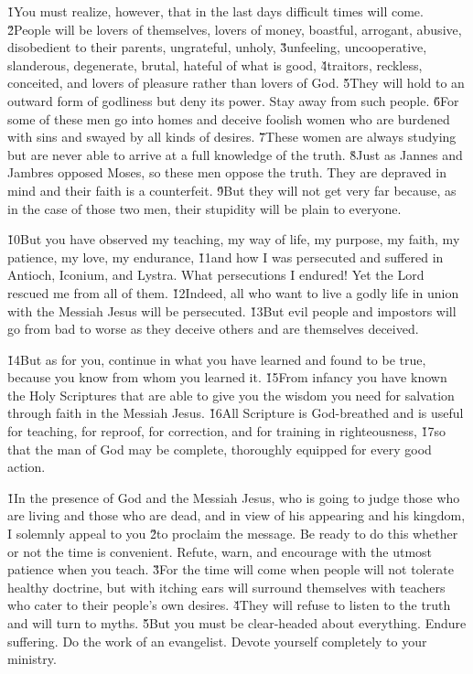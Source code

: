 \v{1}You must realize, however, that in the last days difficult times will come. \v{2}People will be lovers of themselves, lovers of money, boastful, arrogant, abusive, disobedient to their parents, ungrateful, unholy, \v{3}unfeeling, uncooperative, slanderous, degenerate, brutal, hateful of what is good, \v{4}traitors, reckless, conceited, and lovers of pleasure rather than lovers of God. \v{5}They will hold to an outward form of godliness but deny its power. Stay away from such people. \v{6}For some of these men go into homes and deceive foolish women who are burdened with sins and swayed by all kinds of desires. \v{7}These women are always studying but are never able to arrive at a full knowledge of the truth. \v{8}Just as Jannes and Jambres opposed Moses, so these men oppose the truth. They are depraved in mind and their faith is a counterfeit. \v{9}But they will not get very far because, as in the case of those two men, their stupidity will be plain to everyone.

\v{10}But you have observed my teaching, my way of life, my purpose, my faith, my patience, my love, my endurance, \v{11}and how I was persecuted and suffered in Antioch, Iconium, and Lystra. What persecutions I endured! Yet the Lord rescued me from all of them. \v{12}Indeed, all who want to live a godly life in union with the Messiah Jesus will be persecuted. \v{13}But evil people and impostors will go from bad to worse as they deceive others and are themselves deceived.

\v{14}But as for you, continue in what you have learned and found to be true, because you know from whom you learned it. \v{15}From infancy you have known the Holy Scriptures that are able to give you the wisdom you need for salvation through faith in the Messiah Jesus. \v{16}All Scripture is God-breathed and is useful for teaching, for reproof, for correction, and for training in righteousness, \v{17}so that the man of God may be complete, thoroughly equipped for every good action.

\v{1}In the presence of God and the Messiah Jesus, who is going to judge those who are living and those who are dead, and in view of his appearing and his kingdom, I solemnly appeal to you \v{2}to proclaim the message. Be ready to do this whether or not the time is convenient. Refute, warn, and encourage with the utmost patience when you teach. \v{3}For the time will come when people will not tolerate healthy doctrine, but with itching ears will surround themselves with teachers who cater to their people's own desires. \v{4}They will refuse to listen to the truth and will turn to myths. \v{5}But you must be clear-headed about everything. Endure suffering. Do the work of an evangelist. Devote yourself completely to your ministry.

